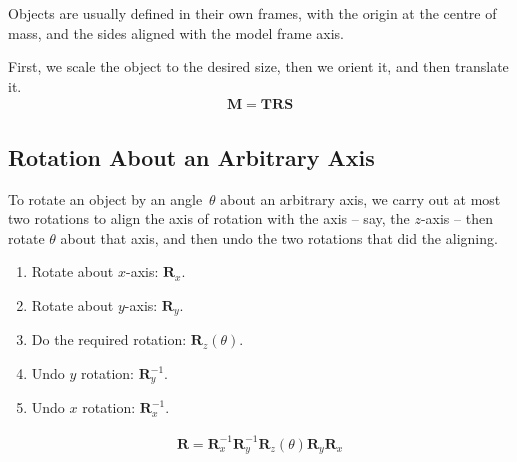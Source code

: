 \documentclass[../COS3712_Notes.tex]{subfiles}
\begin{document}
        Objects are usually defined in their own frames, with the origin at the centre of mass,
        and the sides aligned with the model frame axis.

        First, we scale the object to the desired size, then we orient it, and then translate it.
        \begin{align*}
          \mathbf{M} = \mathbf{TRS}
        \end{align*}

      \subsection{Rotation About an Arbitrary Axis}
        To rotate an object by an angle~$\theta$ about an arbitrary axis, we carry out at most
        two rotations to align the axis of rotation with the axis -- say, the $z$-axis --
        then rotate $\theta$ about that axis, and then undo the two rotations that
        did the aligning.

        \begin{enumerate}[nosep]
          \item Rotate about $x$-axis: $\mathbf{R}_x$.
          \item Rotate about $y$-axis: $\mathbf{R}_y$.
          \item Do the required rotation: $\mathbf{R}_z(\theta)$.
          \item Undo $y$ rotation: $\mathbf{R}^{-1}_y$.
          \item Undo $x$ rotation: $\mathbf{R}^{-1}_x$.
        \end{enumerate}
        \begin{align*}
          \mathbf{R} = \mathbf{R}^{-1}_x \mathbf{R}^{-1}_y \mathbf{R}_z(\theta) \mathbf{R}_y \mathbf{R}_x
        \end{align*}
\end{document}
